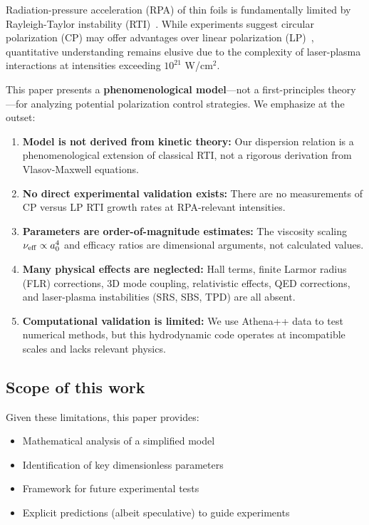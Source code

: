 \documentclass[aps,pre,twocolumn,showpacs,superscriptaddress]{revtex4-2}
\theoremstyle{definition}
\begin{document}
Radiation-pressure acceleration (RPA) of thin foils is fundamentally limited by Rayleigh-Taylor instability (RTI)~\cite{Macchi2013RMP}. While experiments suggest circular polarization (CP) may offer advantages over linear polarization (LP)~\cite{Robinson2009PPCF}, quantitative understanding remains elusive due to the complexity of laser-plasma interactions at intensities exceeding $10^{21}$ W/cm$^2$.

This paper presents a \textbf{phenomenological model}—not a first-principles theory—for analyzing potential polarization control strategies. We emphasize at the outset:

\begin{enumerate}
\item \textbf{Model is not derived from kinetic theory:} Our dispersion relation is a phenomenological extension of classical RTI, not a rigorous derivation from Vlasov-Maxwell equations.

\item \textbf{No direct experimental validation exists:} There are no measurements of CP versus LP RTI growth rates at RPA-relevant intensities.

\item \textbf{Parameters are order-of-magnitude estimates:} The viscosity scaling $\nu_{\rm eff} \propto a_0^4$ and efficacy ratios are dimensional arguments, not calculated values.

\item \textbf{Many physical effects are neglected:} Hall terms, finite Larmor radius (FLR) corrections, 3D mode coupling, relativistic effects, QED corrections, and laser-plasma instabilities (SRS, SBS, TPD) are all absent.

\item \textbf{Computational validation is limited:} We use Athena++ data to test numerical methods, but this hydrodynamic code operates at incompatible scales and lacks relevant physics.
\end{enumerate}

\subsection{Scope of this work}

Given these limitations, this paper provides:
\begin{itemize}
\item Mathematical analysis of a simplified model
\item Identification of key dimensionless parameters
\item Framework for future experimental tests
\item Explicit predictions (albeit speculative) to guide experiments
\end{itemize}
\end{document}
